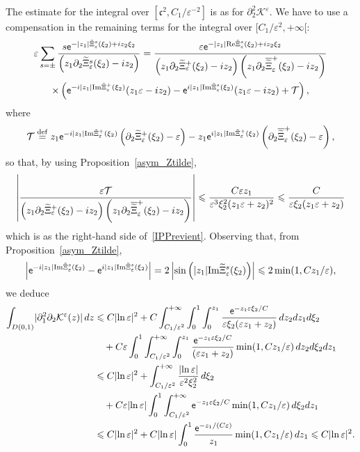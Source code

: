 \documentclass[AHL,Unicode,longabstracts,published]{cedram}
\newcommand*\p{\partial}
\newcommand*\ddef{\stackrel{\rm def}{=}}
\newcommand{\Imm}{\mathrm{Im}}
\newcommand{\Rel}{\mathrm{Re}}
\newcommand*\BK{\mathcal{K}}
\newcommand*\BT{\mathcal{T}}
\newcommand*\ex{{\sf e}}
\newcommand*\cs{{\mathfrak c}}
\newcommand*\ii{\infty}
\newcommand*\ls{\leqslant }
\newcommand*\e{\varepsilon}
\newcommand*\lne{\lvert \ln \varepsilon \rvert}
\renewcommand*\t{\tilde}
\let\oldtilde\tilde
\renewcommand*{\tilde}[1]{\mathchoice{\widetilde{#1}}{\widetilde{#1}}{\oldtilde{#1}}{\oldtilde{#1}}}
\begin{document}
The estimate for the integral over $ [\cs^2, C_1 / \e^{-2}] $ is as for $ \p_2^2 \BK^\e $. We have to use a compensation in the remaining terms for the integral over $ [C_1 / \e^{2}, +\ii [$:
\begin{multline*}
\e \sum_{s = \pm}
\frac{s \ex^{- |z_1| \t\Xi_\e^s (\xi_2) + i z_2 \xi_2} }{\left(z_1 \p_2 \t\Xi_\e^s (\xi_2) - i z_2\right)}
= \frac{\e \ex^{- |z_1| \Rel \t\Xi_\e^s (\xi_2) + i z_2 \xi_2}}{\left(z_1 \p_2 \t\Xi_\e^+ (\xi_2) - i z_2\right)\left(z_1 \p_2 \overline{\t\Xi}_\e^+ (\xi_2) - i z_2\right)} \\
\times \left(\ex^{- i |z_1| {\Imm} \t\Xi_\e^+ (\xi_2) } (z_1 \e - i z_2) - \ex^{ i |z_1| {\Imm} \t\Xi_\e^s (\xi_2) } (z_1 \e - i z_2) + \BT \right),
\end{multline*}
where
\[
\BT \ddef z_1 \ex^{- i |z_1| {\Imm} \t\Xi_\e^+ (\xi_2) } \left(\p_2 \t\Xi_\e^+ (\xi_2) - \e\right) - z_1 \ex^{ i |z_1| {\Imm} \t\Xi_\e^+ (\xi_2) }\left(\p_2 \overline{\t\Xi}_\e^+ (\xi_2) - \e\right),
\]
so that, by using Proposition~\ref{asym_Ztilde},
\[
\left\lvert \frac{ \e \BT }{\left(z_1 \p_2 \t\Xi_\e^+ (\xi_2) - i z_2\right)\left(z_1 \p_2 \overline{\t\Xi}_\e^+ (\xi_2) - i z_2\right) } \right\rvert
\ls \frac{C \e z_1 }{\e^3 \xi_2^2 (z_1 \e + z_2)^2 }
\ls \frac{C }{\e \xi_2 (z_1 \e + z_2) }
\]
which is as the right-hand side of~\eqref{IPPrevient}. Observing that, from Proposition~\ref{asym_Ztilde},
\[
\left\lvert \ex^{ - i |z_1| {\Imm} \t\Xi_\e^s (\xi_2) } - \ex^{ i |z_1| {\Imm} \t\Xi_\e^s (\xi_2) } \right\rvert = 2 \left\lvert \sin \left(|z_1| {\Imm} \t\Xi_\e^s (\xi_2) \right) \right\rvert
\ls 2 \min (1, C z_1/ \e),
\]
we deduce
\begin{align*}
\int_{D(0,1)} \lvert \p_1^2 \p_2 \BK^\e (z) \rvert \, dz & \ls C \lvert \ln \e \rvert^2 + C \int_{ C_1 / \e^{2} }^{ +\ii } \int_0^1 \int_0^{z_1} \frac{ \ex^{- z_1 \e \xi_2 /C } }{ \e \xi_2 (\e z_1 + z_2)} \, dz_2 d z_1 d\xi_2
\\ & \quad + C \e \int_0^1 \int_{ C_1 / \e^{2} }^{ +\ii } \int_0^{z_1} \frac{ \ex^{- z_1 \e \xi_2 /C } }{ (\e z_1 + z_2)} \min (1, C z_1/ \e) \, dz_2 d\xi_2 d z_1
\\ & \ls C \lvert \ln \e \rvert^2 + \int_{C_1/ \e^{2} }^{+\ii } \frac{\lne}{ \e^2 \xi_2^2 } \, d \xi_2
\\ & \quad + C \e \lne \int_0^1 \int_{C_1/ \e^{2} }^{+\ii } \ex^{- z_1 \e \xi_2 /C } \min (1, C z_1/ \e) \, d \xi_2 d z_1
\\
& \ls C \lvert \ln \e \rvert^2 + C \lne \int_0^1 \frac{\ex^{- z_1 / (C \e) } }{z_1 } \min (1, C z_1/ \e) \, d z_1
\ls C \lvert \ln \e \rvert^2.
\end{align*}
\end{document}

